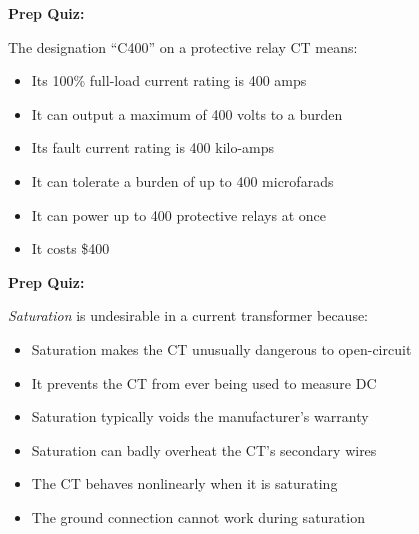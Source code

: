 \vfil \eject

\noindent
{\bf Prep Quiz:}

The designation ``C400'' on a protective relay CT means:

\begin{itemize}
\item{} Its 100\% full-load current rating is 400 amps
\vskip 5pt 
\item{} It can output a maximum of 400 volts to a burden
\vskip 5pt 
\item{} Its fault current rating is 400 kilo-amps 
\vskip 5pt 
\item{} It can tolerate a burden of up to 400 microfarads
\vskip 5pt 
\item{} It can power up to 400 protective relays at once
\vskip 5pt 
\item{} It costs \$400
\end{itemize}














\vfil \eject

\noindent
{\bf Prep Quiz:}

{\it Saturation} is undesirable in a current transformer because:

\begin{itemize}
\item{} Saturation makes the CT unusually dangerous to open-circuit
\vskip 5pt 
\item{} It prevents the CT from ever being used to measure DC
\vskip 5pt 
\item{} Saturation typically voids the manufacturer's warranty
\vskip 5pt 
\item{} Saturation can badly overheat the CT's secondary wires
\vskip 5pt 
\item{} The CT behaves nonlinearly when it is saturating
\vskip 5pt 
\item{} The ground connection cannot work during saturation
\end{itemize}





